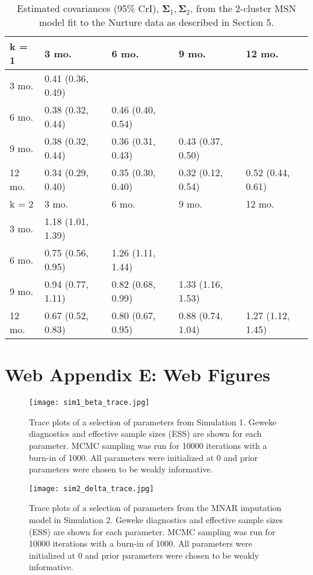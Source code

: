 \documentclass[useAMS,11pt]{article}
\newcommand{\1}{\mathbbm{1}}
\begin{document}
\begin{table}[!htb]
\centering
\caption{\label{tab:cor_mat} Estimated covariances (95\% CrI), $\boldsymbol\Sigma_1, \boldsymbol\Sigma_2$, from the 2-cluster MSN model fit to the Nurture data as described in Section 5.}
\begin{tabular}{lllll}
\toprule
k = 1 & 3 mo. & 6 mo. & 9 mo. & 12 mo. \\ \midrule
3 mo. & 0.41 (0.36, 0.49) &  &  &  \\
6 mo. & 0.38 (0.32, 0.44) & 0.46 (0.40, 0.54) &  &  \\
9 mo. & 0.38 (0.32, 0.44) & 0.36 (0.31, 0.43) & 0.43 (0.37, 0.50) &  \\
12 mo. & 0.34 (0.29, 0.40) & 0.35 (0.30, 0.40) & 0.32 (0.12, 0.54) & 0.52 (0.44, 0.61) \\ \midrule
k = 2 & 3 mo. & 6 mo. & 9 mo. & 12 mo. \\ \midrule
3 mo. & 1.18 (1.01, 1.39) &  &  &  \\
6 mo. & 0.75 (0.56, 0.95) & 1.26 (1.11, 1.44) &  &  \\
9 mo. & 0.94 (0.77, 1.11) & 0.82 (0.68, 0.99) & 1.33 (1.16, 1.53) &  \\
12 mo. & 0.67 (0.52, 0.83) & 0.80 (0.67, 0.95) & 0.88 (0.74, 1.04) & 1.27 (1.12, 1.45) \\ \bottomrule
\end{tabular}
\end{table}

\clearpage

\section*{Web Appendix E: Web Figures}

\begin{figure}[h]
\caption{\label{fig:sim1_trace} Trace plots of a selection of parameters from Simulation 1. Geweke diagnostics and effective sample sizes (ESS) are shown for each parameter. MCMC sampling was run for 10000 iterations with a burn-in of 1000. All parameters were initialized at 0 and prior parameters were chosen to be weakly informative.}
\texttt{[image: sim1\_beta\_trace.jpg]}
\end{figure}

\begin{figure}[h]
\caption{\label{fig:sim2_trace} Trace plots of a selection of parameters from the MNAR imputation model in Simulation 2. Geweke diagnostics and effective sample sizes (ESS) are shown for each parameter. MCMC sampling was run for 10000 iterations with a burn-in of 1000. All parameters were initialized at 0 and prior parameters were chosen to be weakly informative.}
\texttt{[image: sim2\_delta\_trace.jpg]}
\end{figure}
\end{document}

